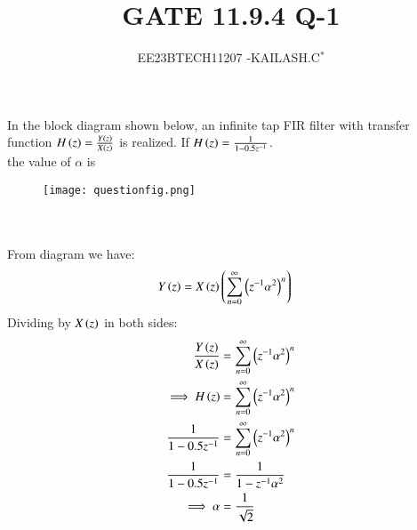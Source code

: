 \documentclass[journal,12pt,twocolumn]{IEEEtran}
\theoremstyle{remark}
\begin{document}

\vspace{3cm}

\title{GATE 11.9.4 Q-1}
\author{EE23BTECH11207 -KAILASH.C$^{*}$%
}
\maketitle
\newpage
\bigskip

\renewcommand{\thefigure}{\theenumi}
\renewcommand{\thetable}{\theenumi}
In the block diagram shown below, an infinite tap FIR filter with transfer function $H\left(z\right)=\frac{Y\left(z\right)}{X\left(z\right)}$ is realized. If $H\left(z\right)=\frac{1}{1-0.5z^{-1}}$.\\the value of $\alpha$ is
\begin{figure}[h]
    \texttt{[image: questionfig.png]}
    \label{fig:question31bm}
\end{figure}\\
\solution
\\
From diagram we have:
\begin{align}
    Y\left(z\right)&=X\left(z\right)\left(\sum_{n=0}^{\infty}\left(z^{-1}\alpha^{2}\right)^n\right)\label{eq:311_bm}
\end{align}
Dividing by $X\left(z\right)$ in both sides:
\begin{align}
    \frac{Y\left(z\right)}{X\left(z\right)}&=\sum_{n=0}^{\infty}\left(z^{-1}\alpha^{2}\right)^n\label{eq:312_bm}\\
    \implies H\left(z\right)&=\sum_{n=0}^{\infty}\left(z^{-1}\alpha^{2}\right)^n\label{eq:313_bm}\\
    \frac{1}{1-0.5z^{-1}}&=\sum_{n=0}^{\infty}\left(z^{-1}\alpha^{2}\right)^n\label{eq:314_bm}\\
\frac{1}{1-0.5z^{-1}}&=\frac{1}{1-z^{-1}\alpha^{2}}\label{eq:315_bm}\\
\implies \alpha&=\frac{1}{\sqrt{2}}\label{eq:316_bm}
\end{align}
\end{document}
